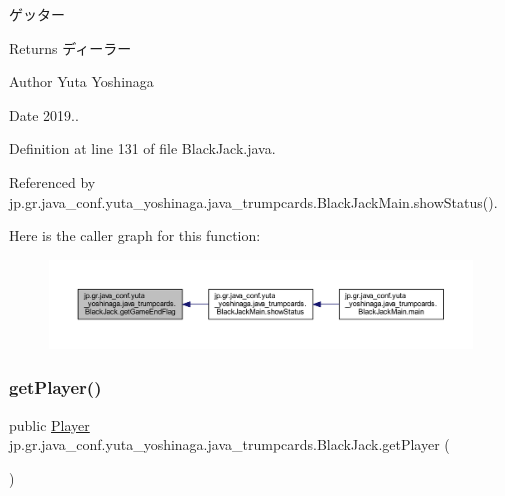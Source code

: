 ゲッター 

\begin{DoxyReturn}{Returns}
ディーラー 
\end{DoxyReturn}
\begin{DoxyAuthor}{Author}
Yuta Yoshinaga 
\end{DoxyAuthor}
\begin{DoxyDate}{Date}
2019.. 
\end{DoxyDate}


Definition at line 131 of file Black\+Jack.\+java.



Referenced by jp.\+gr.\+java\+\_\+conf.\+yuta\+\_\+yoshinaga.\+java\+\_\+trumpcards.\+Black\+Jack\+Main.\+show\+Status().

Here is the caller graph for this function\+:
\nopagebreak
\begin{figure}[H]
\begin{center}
\leavevmode
\includegraphics[width=350pt]{classjp_1_1gr_1_1java__conf_1_1yuta__yoshinaga_1_1java__trumpcards_1_1_black_jack_aa541fa5982861610f084bede8c5d6ac1_icgraph}
\end{center}
\end{figure}
\mbox{\label{classjp_1_1gr_1_1java__conf_1_1yuta__yoshinaga_1_1java__trumpcards_1_1_black_jack_aa4fff12d377006ce93d731a6808b67bd}} 
\subsubsection{\texorpdfstring{get\+Player()}{getPlayer()}}
{\footnotesize\ttfamily public \hyperlink{classjp_1_1gr_1_1java__conf_1_1yuta__yoshinaga_1_1java__trumpcards_1_1_player}{Player} jp.\+gr.\+java\+\_\+conf.\+yuta\+\_\+yoshinaga.\+java\+\_\+trumpcards.\+Black\+Jack.\+get\+Player (\begin{DoxyParamCaption}{ }\end{DoxyParamCaption})}



